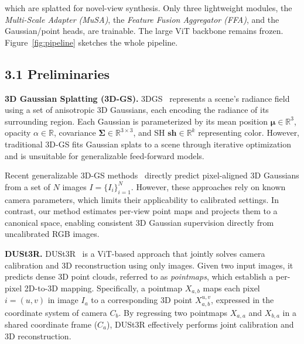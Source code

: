 \documentclass[letterpaper]{article} %
\begin{document}
\noindent which are splatted for novel-view synthesis.  
Only three lightweight modules, the \emph{Multi-Scale Adapter (MuSA)}, the \emph{Feature Fusion Aggregator (FFA)}, and the Gaussian/point heads, are trainable. The large ViT backbone remains frozen.  
Figure~\ref{fig:pipeline} sketches the whole pipeline.
\subsection{3.1 Preliminaries}
\label{subsec:preliminary}
\textbf{3D Gaussian Splatting (3D-GS).} 
3DGS~\cite{kerbl20233d} represents a scene's radiance field using a set of anisotropic 3D Gaussians, each encoding the radiance of its surrounding region. Each Gaussian is parameterized by its mean position $\boldsymbol{\mu} \in \mathbb{R}^3$, opacity $\alpha \in \mathbb{R}$, covariance $\boldsymbol{\Sigma} \in \mathbb{R}^{3 \times 3}$, and SH $\boldsymbol{sh} \in \mathbb{R}^k$ representing color. 
However, traditional 3D-GS fits Gaussian splats to a scene through iterative optimization and is unsuitable for generalizable feed-forward models.

Recent generalizable 3D-GS methods~\cite{charatan2024pixelsplat, chen2024mvsplat, szymanowicz2024flash3d, szymanowicz2024splatter} directly predict pixel-aligned 3D Gaussians from a set of $N$ images $I=\{I_i\}_{i=1}^{N}$. 
However, these approaches rely on known camera parameters, which limits their applicability to calibrated settings. In contrast, our method estimates per-view point maps and projects them to a canonical space, enabling consistent 3D Gaussian supervision directly from uncalibrated RGB images.

\noindent\textbf{DUSt3R.}  DUSt3R~\cite{wang2024dust3r} is a ViT-based approach that jointly solves camera calibration and 3D reconstruction using only images. Given two input images, it predicts dense 3D point clouds, referred to as \textit{pointmaps}, which establish a per-pixel 2D-to-3D mapping. Specifically, a pointmap $X_{a,b}$ maps each pixel $i = (u, v)$ in image $I_a$ to a corresponding 3D point $X_{a,b}^{u,v}$, expressed in the coordinate system of camera $C_b$. By regressing two pointmaps $X_{a,a}$ and $X_{b,a}$ in a shared coordinate frame ($C_a$), DUSt3R effectively performs joint calibration and 3D reconstruction.
\end{document}
